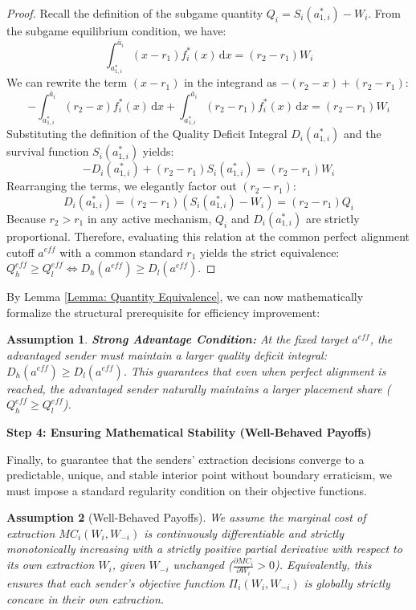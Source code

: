 \documentclass[12pt, a4paper]{article}
\newtheorem{assumption}{Assumption}
\begin{document}
\begin{proof}
    Recall the definition of the subgame quantity $Q_i = S_i(a_{1,i}^*) - W_i$. 
    From the subgame equilibrium condition, we have:
    \[
        \int_{a_{1,i}^*}^{\bar{a}_i} (x - r_1) f_i^*(x) \, \mathrm{d}x = (r_2 - r_1)W_i
    \]
    We can rewrite the term $(x - r_1)$ in the integrand as $-(r_2 - x) + (r_2 - r_1)$:
    \[
        -\int_{a_{1,i}^*}^{\bar{a}_i} (r_2 - x) f_i^*(x) \, \mathrm{d}x + \int_{a_{1,i}^*}^{\bar{a}_i} (r_2 - r_1) f_i^*(x) \, \mathrm{d}x = (r_2 - r_1)W_i
    \]
    Substituting the definition of the Quality Deficit Integral $D_i(a_{1,i}^*)$ and the survival function $S_i(a_{1,i}^*)$ yields:
    \[
        -D_i(a_{1,i}^*) + (r_2 - r_1)S_i(a_{1,i}^*) = (r_2 - r_1)W_i
    \]
    Rearranging the terms, we elegantly factor out $(r_2 - r_1)$:
    \[
        D_i(a_{1,i}^*) = (r_2 - r_1)(S_i(a_{1,i}^*) - W_i) = (r_2 - r_1)Q_i
    \]
    Because $r_2 > r_1$ in any active mechanism, $Q_i$ and $D_i(a_{1,i}^*)$ are strictly proportional. Therefore, evaluating this relation at the common perfect alignment cutoff $a^{eff}$ with a common standard $r_1$ yields the strict equivalence: $Q_h^{eff} \ge Q_l^{eff} \iff D_h(a^{eff}) \ge D_l(a^{eff})$.
\end{proof}

By Lemma \ref{Lemma: Quantity Equivalence}, we can now mathematically formalize the structural prerequisite for efficiency improvement:

\begin{assumption}
\label{As: Strong Advantage Condition}
    \textbf{Strong Advantage Condition:} At the fixed target $a^{eff}$, the advantaged sender must maintain a larger quality deficit integral: $D_h(a^{eff}) \ge D_l(a^{eff})$. This guarantees that even when perfect alignment is reached, the advantaged sender naturally maintains a larger placement share ($Q_h^{eff} \ge Q_l^{eff}$).
\end{assumption}


\textbf{Step 4: Ensuring Mathematical Stability (Well-Behaved Payoffs)}

Finally, to guarantee that the senders' extraction decisions converge to a predictable, unique, and stable interior point without boundary erraticism, we must impose a standard regularity condition on their objective functions.

\begin{assumption}[Well-Behaved Payoffs]
    \label{As: Regularity of Survival Function}
    We assume the marginal cost of extraction $MC_i(W_i, W_{-i})$ is continuously differentiable and strictly monotonically increasing with a strictly positive partial derivative with respect to its own extraction $W_i$, given $W_{-i}$ unchanged ($\frac{\partial MC_i}{\partial W_i} > 0$). Equivalently, this ensures that each sender's objective function $\Pi_i(W_i, W_{-i})$ is globally strictly concave in their own extraction. 
\end{assumption}
\end{document}
